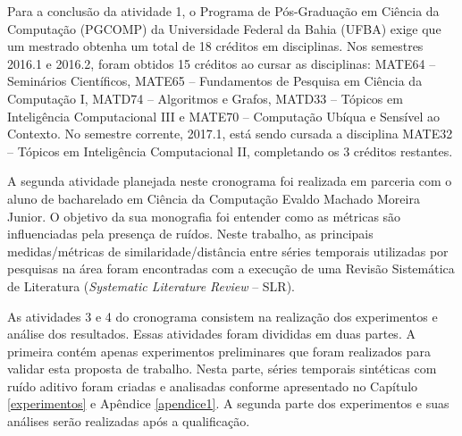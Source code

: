 Para a conclusão da atividade 1, o Programa de Pós-Graduação em Ciência da Computação (PGCOMP) da Universidade Federal da Bahia (UFBA) exige que um mestrado obtenha um total de 18 créditos em disciplinas. Nos semestres 2016.1 e 2016.2, foram obtidos 15 créditos ao cursar as disciplinas: MATE64 -- Seminários Científicos, MATE65 -- Fundamentos de Pesquisa em Ciência da Computação I, MATD74 --  Algoritmos e Grafos, MATD33 -- Tópicos em Inteligência Computacional III e  MATE70 -- Computação Ubíqua e Sensível ao Contexto. No semestre corrente, 2017.1, está sendo cursada a disciplina MATE32 -- Tópicos em Inteligência Computacional II, completando os 3 créditos restantes. 

A segunda atividade planejada neste cronograma foi realizada em parceria com o aluno de bacharelado em Ciência da Computação Evaldo Machado Moreira Junior. O objetivo da sua monografia foi entender como as métricas são influenciadas pela presença de ruídos. Neste trabalho, as principais medidas/métricas de similaridade/distância entre séries temporais utilizadas por pesquisas na área foram encontradas com a execução de uma Revisão Sistemática de Literatura (\emph{Systematic Literature Review} -- SLR). 

As atividades 3 e 4 do cronograma consistem na realização dos experimentos e análise dos resultados. Essas atividades foram divididas em duas partes. A primeira contém apenas experimentos preliminares que foram realizados para validar esta proposta de trabalho. Nesta parte, séries temporais sintéticas com ruído aditivo foram criadas e analisadas conforme apresentado no Capítulo \ref{experimentos} e Apêndice \ref{apendice1}. A segunda parte dos experimentos e suas análises serão realizadas após a qualificação.




